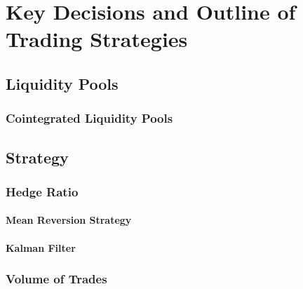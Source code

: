 \chapter{Key Decisions and Outline of Trading Strategies}

\section{Liquidity Pools}
\subsection{Cointegrated Liquidity Pools}

\section{Strategy}

\subsection{Hedge Ratio}
\subsubsection{Mean Reversion Strategy}
\subsubsection{Kalman Filter}

\subsection{Volume of Trades}
